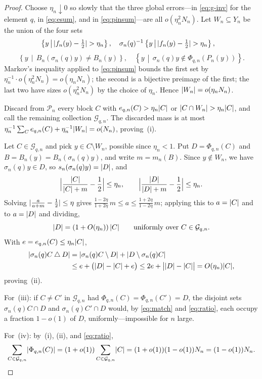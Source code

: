 \documentclass[11pt]{amsart}
\theoremstyle{definition}
\theoremstyle{plain}
\newcommand{\cP}{\mathcal P}
\newcommand{\cG}{\mathcal G}
\DeclarePairedDelimiter{\abs}{\lvert}{\rvert}
\newcommand{\set}[1]{\left\{#1\right\}}
\newcommand{\suchthat}{\,\middle|\,}
\newcommand{\symdiff}{\mathbin{\triangle}}
\begin{document}
\begin{proof}
Choose \(\eta_n\downarrow0\) so slowly that the three global errors---in \eqref{eq:g-inv} for the element \(q\), in \eqref{eq:esum}, and in \eqref{eq:pinsum}---are all \(o(\eta_n^2N_n)\).  Let \(W_n\subseteq Y_n\) be the union of the four sets
\[
 \set{y\suchthat\abs{f_n(y)-\tfrac12}>\eta_n},\quad
 \sigma_n(q)^{-1}\set{y\suchthat\abs{f_n(y)-\tfrac12}>\eta_n},\quad
\]
\[
 \set{y\suchthat B_n(\sigma_n(q)y)\ne B_n(y)},\quad
 \set{y\suchthat\sigma_n(q)y\notin\Phi_{q,n}(P_n(y))}.
\]
Markov's inequality applied to \eqref{eq:pinsum} bounds the first set by \(\eta_n^{-1}\cdot o(\eta_n^2N_n)=o(\eta_nN_n)\); the second is a bijective preimage of the first; the last two have sizes \(o(\eta_n^2N_n)\) by the choice of \(\eta_n\).  Hence \(\abs{W_n}=o(\eta_nN_n)\).

Discard from \(\cP_n\) every block \(C\) with \(e_{q,n}(C)>\eta_n\abs C\) or \(\abs{C\cap W_n}>\eta_n\abs C\), and call the remaining collection \(\cG_{q,n}\).  The discarded mass is at most \(\eta_n^{-1}\sum_Ce_{q,n}(C)+\eta_n^{-1}\abs{W_n}=o(N_n)\), proving~(i).

Let \(C\in\cG_{q,n}\) and pick \(y\in C\setminus W_n\), possible since \(\eta_n<1\).  Put \(D=\Phi_{q,n}(C)\) and \(B=B_n(y)=B_n(\sigma_n(q)y)\), and write \(m=m_n(B)\).  Since \(y\notin W_n\), we have \(\sigma_n(q)y\in D\), so \(s_n(\sigma_n(q)y)=\abs D\), and
\[
 \abs[\Big]{\frac{\abs C}{\abs C+m}-\frac12}\leq\eta_n,
 \qquad
 \abs[\Big]{\frac{\abs D}{\abs D+m}-\frac12}\leq\eta_n.
\]
Solving \(\abs{\frac{a}{a+m}-\frac12}\leq\eta\) gives \(\frac{1-2\eta}{1+2\eta}\,m\leq a\leq\frac{1+2\eta}{1-2\eta}\,m\); applying this to \(a=\abs C\) and to \(a=\abs D\) and dividing,
\begin{equation}\label{eq:ratio}
 \abs D=(1+O(\eta_n))\,\abs C
 \qquad\text{uniformly over }C\in\cG_{q,n}.
\end{equation}
With \(e=e_{q,n}(C)\leq\eta_n\abs C\),
\begin{align*}
 \abs{\sigma_n(q)C\symdiff D}
 &=\abs{\sigma_n(q)C\setminus D}+\abs{D\setminus\sigma_n(q)C}\\
 &\leq e+\bigl(\abs D-\abs C+e\bigr)
 \leq2e+\abs[\big]{\abs D-\abs C}
 =O(\eta_n)\abs C,
\end{align*}
proving~(ii).

For~(iii): if \(C\ne C'\) in \(\cG_{q,n}\) had \(\Phi_{q,n}(C)=\Phi_{q,n}(C')=D\), the disjoint sets \(\sigma_n(q)C\cap D\) and \(\sigma_n(q)C'\cap D\) would, by \eqref{eq:match} and \eqref{eq:ratio}, each occupy a fraction \(1-o(1)\) of \(D\), uniformly---impossible for \(n\) large.

For~(iv): by~(i), (ii), and \eqref{eq:ratio},
\[
 \sum_{C\in\cG_{q,n}}\abs{\Phi_{q,n}(C)}
 =(1+o(1))\sum_{C\in\cG_{q,n}}\abs C
 =(1+o(1))(1-o(1))N_n
 =(1-o(1))N_n.\qedhere
\]
\end{proof}
\end{document}
